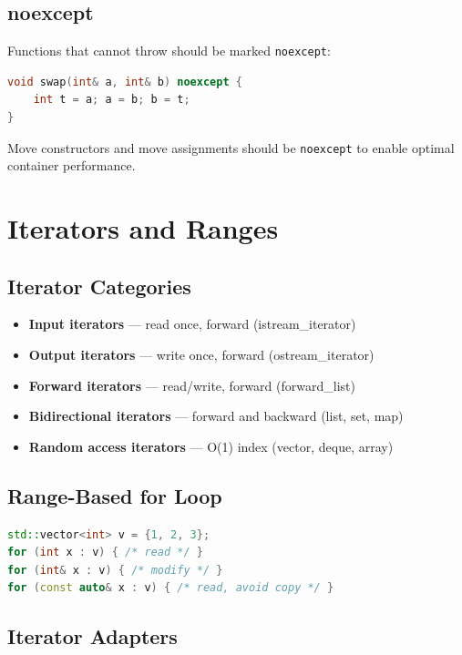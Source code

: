 \subsection{noexcept}

Functions that cannot throw should be marked \texttt{noexcept}:

\begin{lstlisting}[language=C++]
void swap(int& a, int& b) noexcept {
    int t = a; a = b; b = t;
}
\end{lstlisting}

Move constructors and move assignments should be \texttt{noexcept} to enable optimal container performance.

\section{Iterators and Ranges}

\subsection{Iterator Categories}

\begin{itemize}
\item \textbf{Input iterators} — read once, forward (istream\_iterator)
\item \textbf{Output iterators} — write once, forward (ostream\_iterator)
\item \textbf{Forward iterators} — read/write, forward (forward\_list)
\item \textbf{Bidirectional iterators} — forward and backward (list, set, map)
\item \textbf{Random access iterators} — O(1) index (vector, deque, array)
\end{itemize}

\subsection{Range-Based for Loop}

\begin{lstlisting}[language=C++]
std::vector<int> v = {1, 2, 3};
for (int x : v) { /* read */ }
for (int& x : v) { /* modify */ }
for (const auto& x : v) { /* read, avoid copy */ }
\end{lstlisting}

\subsection{Iterator Adapters}

